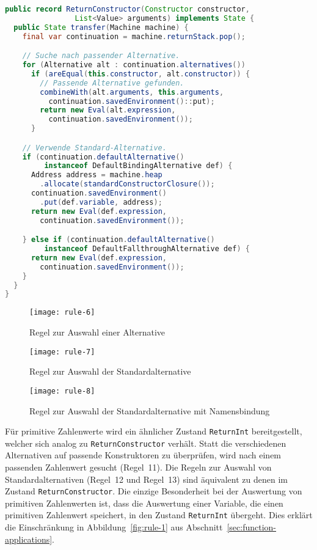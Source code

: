 \begin{lstlisting}[language=java, morekeywords={record, var}, caption={Implementierung der Auswahl einer Alternative}]
public record ReturnConstructor(Constructor constructor,
                List<Value> arguments) implements State {
  public State transfer(Machine machine) {
    final var continuation = machine.returnStack.pop();

    // Suche nach passender Alternative.
    for (Alternative alt : continuation.alternatives())
      if (areEqual(this.constructor, alt.constructor)) {
        // Passende Alternative gefunden.
        combineWith(alt.arguments, this.arguments,
          continuation.savedEnvironment()::put);
        return new Eval(alt.expression,
          continuation.savedEnvironment());
      }

    // Verwende Standard-Alternative.
    if (continuation.defaultAlternative()
         instanceof DefaultBindingAlternative def) {
      Address address = machine.heap
        .allocate(standardConstructorClosure());
      continuation.savedEnvironment()
        .put(def.variable, address);
      return new Eval(def.expression,
        continuation.savedEnvironment());

    } else if (continuation.defaultAlternative()
         instanceof DefaultFallthroughAlternative def) {
      return new Eval(def.expression,
        continuation.savedEnvironment());
    }
  }
}
\end{lstlisting}

\vfill

\pagebreak

\begin{figure}[h]
  \centering
  \texttt{[image: rule-6]}
  \caption{Regel zur Auswahl einer Alternative}\label{fig:rule-6}
\end{figure}

\begin{figure}[h]
  \centering
  \texttt{[image: rule-7]}
  \caption{Regel zur Auswahl der Standardalternative}\label{fig:rule-7}
\end{figure}

\begin{figure}[h!]
  \centering
  \texttt{[image: rule-8]}
  \caption{Regel zur Auswahl der Standardalternative mit Namensbindung}\label{fig:rule-8}
\end{figure}

Für primitive Zahlenwerte wird ein ähnlicher Zustand \texttt{ReturnInt} bereitgestellt, welcher sich analog zu \texttt{ReturnConstructor} verhält.
Statt die verschiedenen Alternativen auf passende Konstruktoren zu überprüfen, wird nach einem passenden Zahlenwert gesucht (Regel~11).
Die Regeln zur Auswahl von Standardalternativen (Regel~12 und Regel~13) sind äquivalent zu denen im Zustand \texttt{ReturnConstructor}.
Die einzige Besonderheit bei der Auswertung von primitiven Zahlenwerten ist, dass die Auswertung einer Variable, die einen primitiven Zahlenwert speichert, in den Zustand \texttt{ReturnInt} übergeht.
Dies erklärt die Einschränkung in Abbildung~\ref{fig:rule-1} aus Abschnitt~\ref{sec:function-applications}.


